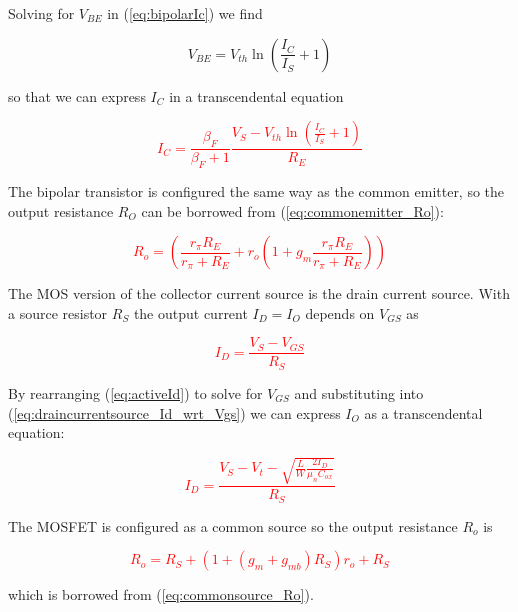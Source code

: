 Solving for $V_{BE}$ in (\ref{eq:bipolarIc}) we find

\begin{equation}
V_{BE} = V_{th}\ln\left(\frac{I_{C}}{I_{S}}+1\right)
\end{equation}

so that we can express $I_{C}$ in a transcendental equation

\textcolor{red}{
\begin{equation}
I_{C} = \frac{\beta_{F}}{\beta_{F}+1} \frac{V_{S}-V_{th}\ln\left(\frac{I_{C}}{I_{S}}+1\right)}{R_{E}}
\end{equation}
}

The bipolar transistor is configured the same way as the common emitter, so the output resistance $R_{O}$ can be borrowed from (\ref{eq:commonemitter_Ro}):

\textcolor{red}{
\begin{equation}
R_{o} = \left(\frac{r_{\pi}R_{E}}{r_{\pi}+R_{E}} + r_{o}\left(1+g_{m}\frac{r_{\pi}R_{E}}{r_{\pi}+R_{E}}\right)\right)
\end{equation}
}

The MOS version of the collector current source is the drain current source.
With a source resistor $R_{S}$ the output current $I_{D} = I_{O}$ depends on $V_{GS}$ as

\textcolor{red}{
\begin{equation}
I_{D} = \frac{V_{S}-V_{GS}}{R_{S}}
\label{eq:draincurrentsource_Id_wrt_Vgs}
\end{equation}
}

By rearranging (\ref{eq:activeId}) to solve for $V_{GS}$ and substituting into (\ref{eq:draincurrentsource_Id_wrt_Vgs}) we can express $I_{O}$ as a transcendental equation:

\textcolor{red}{
\begin{equation}
I_{D} = \frac{V_{S}-V_{t}-\sqrt{\frac{L}{W}\frac{2I_{D}}{\mu_{n}C_{ox}}}}{R_{S}}
\end{equation}
}

The MOSFET is configured as a common source so the output resistance $R_{o}$ is

\textcolor{red}{
\begin{equation}
R_{o} = R_{S} + (1+(g_{m}+g_{mb})R_{S})r_{o}+R_{S}
\end{equation}
}

which is borrowed from (\ref{eq:commonsource_Ro}).

